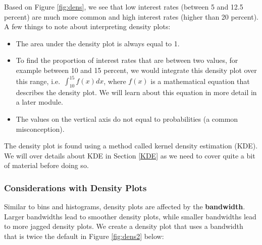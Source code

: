 \documentclass[
]{book}
\newenvironment{Shaded}{\begin{snugshade}}{\end{snugshade}}
\newcommand{\AttributeTok}[1]{\textcolor[rgb]{0.13,0.29,0.53}{#1}}
\newcommand{\DecValTok}[1]{\textcolor[rgb]{0.00,0.00,0.81}{#1}}
\newcommand{\FunctionTok}[1]{\textcolor[rgb]{0.13,0.29,0.53}{\textbf{#1}}}
\newcommand{\NormalTok}[1]{#1}
\newcommand{\SpecialCharTok}[1]{\textcolor[rgb]{0.81,0.36,0.00}{\textbf{#1}}}
\newcommand{\StringTok}[1]{\textcolor[rgb]{0.31,0.60,0.02}{#1}}
\providecommand{\tightlist}{%
  \setlength{\itemsep}{0pt}\setlength{\parskip}{0pt}}
\begin{document}
Based on Figure \ref{fig:dens}, we see that low interest rates (between 5 and 12.5 percent) are much more common and high interest rates (higher than 20 percent). A few things to note about interpreting density plots:

\begin{itemize}
\tightlist
\item
  The area under the density plot is always equal to 1.
\item
  To find the proportion of interest rates that are between two values, for example between 10 and 15 percent, we would integrate this density plot over this range, i.e.~\(\int_{10}^{15} f(x) dx\), where \(f(x)\) is a mathematical equation that describes the density plot. We will learn about this equation in more detail in a later module.
\item
  The values on the vertical axis do not equal to probabilities (a common misconception).
\end{itemize}

The density plot is found using a method called kernel density estimation (KDE). We will over details about KDE in Section \ref{KDE} as we need to cover quite a bit of material before doing so.

\hypertarget{considerations-with-density-plots}{%
\subsubsection{Considerations with Density Plots}\label{considerations-with-density-plots}}

Similar to bins and histograms, density plots are affected by the \textbf{bandwidth}. Larger bandwidths lead to smoother density plots, while smaller bandwidths lead to more jagged density plots. We create a density plot that uses a bandwidth that is twice the default in Figure \ref{fig:dens2} below:

\begin{Shaded}
\end{Shaded}
\end{document}
